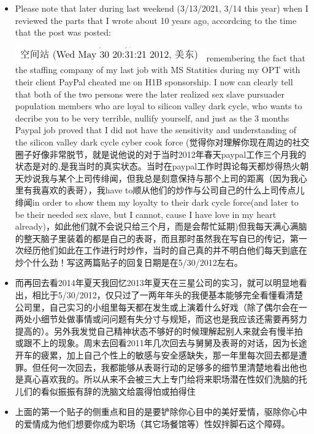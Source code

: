 \documentclass[9pt, b5paper]{article}
\begin{document}
\begin{enumerate}
\begin{enumerate}
\begin{itemize}
\item Please note that later during last weekend (3/13/2021, 3/14 this year) when I reviewed the parts that I wrote about 10 years ago, accordcing to the time that the post was posted: 

\includegraphics[width=.9\linewidth]{./pic/p1p108-date.png} remembering the fact that the staffing company of my last job with MS Statitics during my OPT with their client PayPal cheated me on H1B sponsorship. I now can clearly tell that both of the two persons were the later realized sex slave pursuader population members who are loyal to silicon valley dark cycle, who wants to decribe you to be very terrible, nullify yourself, and just as the 3 months Paypal job proved that I did not have the sensitivity and understanding of the silicon valley dark cycle cyber cook force (觉得你对理解你现在周边的社交圈子好像非常脱节，就是说他说的对于当时2012年春天paypal工作三个月我的状态是对的,是我当时的真实状态。当时在paypal工作时舆论每天都炒得热火朝天炒说我与某个上司传绯闻，但我总是刻意保持与那个上司的距离（因为我心里有我喜欢的表哥），我have to顺从他们的炒作与公司自己的什么上司传点儿绯闻in order to show them my loyalty to their dark cycle force(and later to be their needed sex slave, but I cannot, cause I have love in my heart already)，如此他们就不会说只给三个月，而是会帮忙延期)但我每天满心满脑的整天脑子里装着的都是自己的表哥，而且那时虽然我在写自已的传记，第一次经历他们如此在工作进行时炒作，当时的自己真的并不明白他们每天到底在炒个什么劲！写这两篇贴子的回复日期是在5/30/2012左右。
\item 而再回去看2014年夏天我回忆2013年夏天在三星公司的实习，就可以明显地看出，相比于5/30/2012，仅只过了一两年年头的我便基本能够完全看懂看清楚公司里，自己实习的小组里每天都在发生或上演着什么好戏（除了偶尔会在一两处小细节处做事情或问问题有失分寸与规矩，而这也是我应该还需要再努力提高的）。另外我发觉自己精神状态不够好的时候理解起别人来就会有慢半拍或跟不上的现象。周末去回看2011年几次回去与舅舅及表哥的对话，因为长途开车的疲累，加上自己个性上的敏感与安全感缺失，那一年里每次回去都是遭罪。但任何一次回去，我都能够从表哥行动的足够多的细节里清楚地看出他也是真心喜欢我的。所以从来不会被三大上专门给将来职场潜在性奴们洗脑的托儿们的看似振振有辞的洗脑文给震得怕或拍得住
\item 上面的第一个贴子的侧重点和目的是要铲除你心目中的美好爱情，驱除你心中的爱情成为他们想要你成为职场（其它场餐馆等）性奴拌脚石这个障碍。

\end{itemize}
\end{enumerate}
\end{enumerate}
\end{document}
